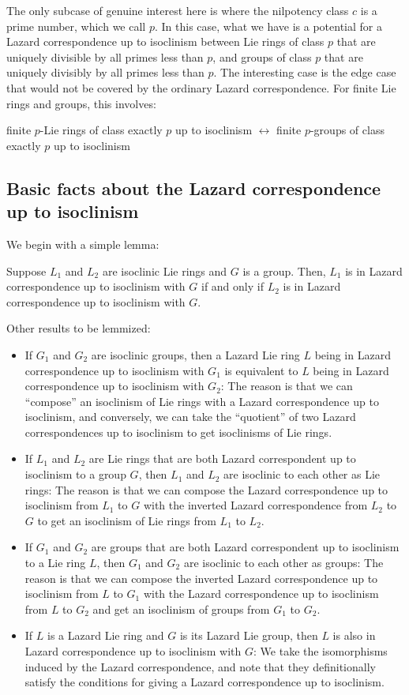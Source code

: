 The only subcase of genuine interest here is where the nilpotency
class $c$ is a prime number, which we call $p$. In this case, what we
have is a potential for a Lazard correspondence up to isoclinism
between Lie rings of class $p$ that are uniquely divisible by all
primes less than $p$, and groups of class $p$ that are uniquely
divisibly by all primes less than $p$. The interesting case is the
edge case that would not be covered by the ordinary Lazard
correspondence. For finite Lie rings and groups, this involves:

finite $p$-Lie rings of class exactly $p$ up to isoclinism
$\leftrightarrow$ finite $p$-groups of class exactly $p$ up to
isoclinism

\subsection{Basic facts about the Lazard correspondence up to isoclinism}

We begin with a simple lemma:

\begin{lemma}
  Suppose $L_1$ and $L_2$ are isoclinic Lie rings and $G$ is a
  group. Then, $L_1$ is in Lazard correspondence up to isoclinism with
  $G$ if and only if $L_2$ is in Lazard correspondence up to
  isoclinism with $G$.
\end{lemma}

Other results to be lemmized:

\begin{itemize}
\item If $G_1$ and $G_2$ are isoclinic groups, then a Lazard Lie ring
  $L$ being in Lazard correspondence up to isoclinism with $G_1$ is
  equivalent to $L$ being in Lazard correspondence up to isoclinism
  with $G_2$: The reason is that we can ``compose'' an isoclinism of
  Lie rings with a Lazard correspondence up to isoclinism, and
  conversely, we can take the ``quotient'' of two Lazard
  correspondences up to isoclinism to get isoclinisms of Lie rings.
\item If $L_1$ and $L_2$ are Lie rings that are both Lazard
  correspondent up to isoclinism to a group $G$, then $L_1$ and $L_2$
  are isoclinic to each other as Lie rings: The reason is that we can
  compose the Lazard correspondence up to isoclinism from $L_1$
  to $G$ with the inverted Lazard correspondence from $L_2$ to $G$ to
  get an isoclinism of Lie rings from $L_1$ to $L_2$.
\item If $G_1$ and $G_2$ are groups that are both Lazard correspondent
  up to isoclinism to a Lie ring $L$, then $G_1$ and $G_2$ are
  isoclinic to each other as groups: The reason is that we can compose
  the inverted Lazard correspondence up to isoclinism from $L$ to
  $G_1$ with the Lazard correspondence up to isoclinism from $L$ to
  $G_2$ and get an isoclinism of groups from $G_1$ to $G_2$.
\item If $L$ is a Lazard Lie ring and $G$ is its Lazard Lie group,
  then $L$ is also in Lazard correspondence up to isoclinism with $G$:
  We take the isomorphisms induced by the Lazard correspondence, and
  note that they definitionally satisfy the conditions for giving a
  Lazard correspondence up to isoclinism.
\end{itemize}

